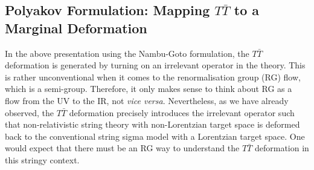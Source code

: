\documentclass[11pt]{article}
\renewcommand{\emph}[1]{\textit{#1}}
\begin{document}
\subsection{Polyakov Formulation: Mapping \texorpdfstring{$T\bar{T}$}{TTbar} to a Marginal Deformation}
\label{sec:TTbarPoly}

In the above presentation using the Nambu-Goto formulation, the $T\bar{T}$ deformation is generated by turning on an irrelevant operator in the theory. This is rather unconventional when it comes to the renormalisation group (RG) flow, which is a semi-group. Therefore, it only makes sense to think about RG as a flow from the UV to the IR, not \emph{vice versa}. Nevertheless, as we have already observed, the $T\bar{T}$ deformation precisely introduces the irrelevant operator such that non-relativistic string theory with non-Lorentzian target space is deformed back to the conventional string sigma model with a Lorentzian target space. One would expect that there must be an RG way to understand the $T\bar{T}$ deformation in this stringy context. 
\end{document}
